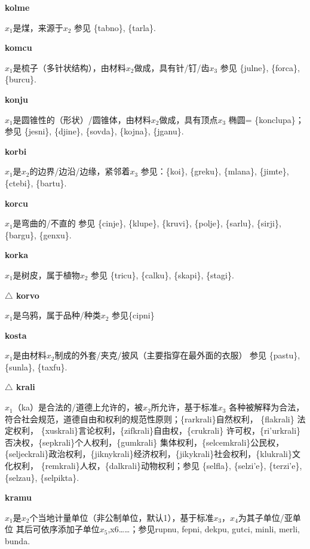 \documentclass[notitlepage,twocolumn,a4paper,10pt]{book}
\begin{document}
{\sffamily\bfseries kolme}\enspace {\ttfamily\bfseries[kol     ko'e]}  $x_1$是煤，来源于$x_2$ \textemdash{} 参见 \{tabno\}, \{tarla\}.

{\sffamily\bfseries komcu}\enspace {\ttfamily\bfseries[kom]}  $x_1$是梳子（多针状结构），由材料$x_2$做成，具有针\slash{}钉\slash{}齿$x_3$ \textemdash{} 参见 \{julne\}, \{forca\}, \{burcu\}.

{\sffamily\bfseries konju}\enspace {\ttfamily\bfseries[kon     ko'u]}  $x_1$是圆锥性的（形状）\slash{}圆锥体，由材料$x_2$做成，具有顶点$x_3$ \textemdash{} 椭圆= \{konclupa\}；参见 \{jesni\}, \{djine\}, \{sovda\}, \{kojna\}, \{jganu\}.

{\sffamily\bfseries korbi}  $x_1$是$x_2$的边界\slash{}边沿\slash{}边缘，紧邻着$x_3$ \textemdash{} 参见：\{koi\}, \{greku\}, \{mlana\}, \{jimte\}, \{ctebi\}, \{bartu\}.

{\sffamily\bfseries korcu}\enspace {\ttfamily\bfseries[    kro]}  $x_1$是弯曲的\slash{}不直的 \textemdash{} 参见 \{cinje\}, \{klupe\}, \{kruvi\}, \{polje\}, \{sarlu\}, \{sirji\}, \{bargu\}, \{genxu\}.

{\sffamily\bfseries korka}\enspace {\ttfamily\bfseries[kok]}  $x_1$是树皮，属于植物$x_2$ \textemdash{} 参见 \{tricu\}, \{calku\}, \{skapi\}, \{stagi\}.

{\sffamily\bfseries $\triangle$ korvo} $x_1$是乌鸦，属于品种\slash{}种类$x_2$ \textemdash{} 参见\{cipni\}

{\sffamily\bfseries kosta}\enspace {\ttfamily\bfseries[kos]}  $x_1$是由材料$x_2$制成的外套\slash{}夹克\slash{}披风（主要指穿在最外面的衣服） \textemdash{} 参见 \{pastu\}, \{sunla\}, \{taxfu\}.

{\sffamily\bfseries $\triangle$ krali} $x_1$（ka）是合法的\slash{}道德上允许的，被$x_2$所允许，基于标准$x_3$ \textemdash{} 各种被解释为合法，符合社会规范，道德自由和权利的规范性原则；\{rarkrali\}自然权利， \{flakrali\} 法定权利， \{xuskrali\}言论权利，\{zifkrali\}自由权，\{crukrali\} 许可权，\{ri'urkrali\} 否决权，\{sepkrali\}个人权利，\{gumkrali\} 集体权利，\{selcemkrali\}公民权，\{seljeckrali\}政治权利，\{jiknykrali\}经济权利，\{jikykrali\}社会权利，\{klukrali\}文化权利， \{remkrali\}人权，\{dalkrali\}动物权利；参见 \{selfla\}, \{selzi'e\}, \{terzi'e\}, \{selzau\}, \{selpikta\}.

{\sffamily\bfseries kramu} $x_1$是$x_2$个当地计量单位（非公制单位，默认1），基于标准$x_3$，$x_4$为其子单位\slash{}亚单位 \textemdash{} 其后可依序添加子单位$x_5$,x6……；参见{rupnu}, {fepni}, {dekpu}, {gutci}, {minli}, {merli}, {bunda}.
\end{document}
